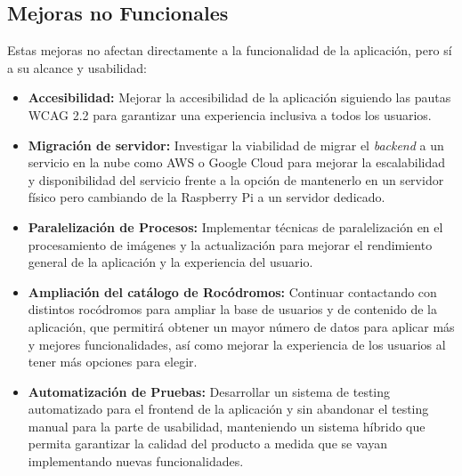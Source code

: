 \subsection{Mejoras no Funcionales}
Estas mejoras no afectan directamente a la funcionalidad de la aplicación, pero sí a su alcance y usabilidad:

\begin{itemize}
    \item \textbf{Accesibilidad:} Mejorar la accesibilidad de la aplicación siguiendo las pautas WCAG 2.2 para garantizar una experiencia inclusiva a todos los usuarios.
    \item \textbf{Migración de servidor:} Investigar la viabilidad de migrar el \textit{backend} a un servicio en la nube como AWS o Google Cloud para mejorar la escalabilidad y disponibilidad del servicio frente a la opción de mantenerlo en un servidor físico pero cambiando de la Raspberry Pi a un servidor dedicado.
    \item \textbf{Paralelización de Procesos:} Implementar técnicas de paralelización en el procesamiento de imágenes y la actualización para mejorar el rendimiento general de la aplicación y la experiencia del usuario. 
    \item \textbf{Ampliación del catálogo de Rocódromos:} Continuar contactando con distintos rocódromos para ampliar la base de usuarios y de contenido de la aplicación, que permitirá obtener un mayor número de datos para aplicar más y mejores funcionalidades, así como mejorar la experiencia de los usuarios al tener más opciones para elegir. 
    \item \textbf{Automatización de Pruebas:} Desarrollar un sistema de testing automatizado para el frontend de la aplicación y sin abandonar el testing manual para la parte de usabilidad, manteniendo un sistema híbrido que permita garantizar la calidad del producto a medida que se vayan implementando nuevas funcionalidades. 
\end{itemize}
